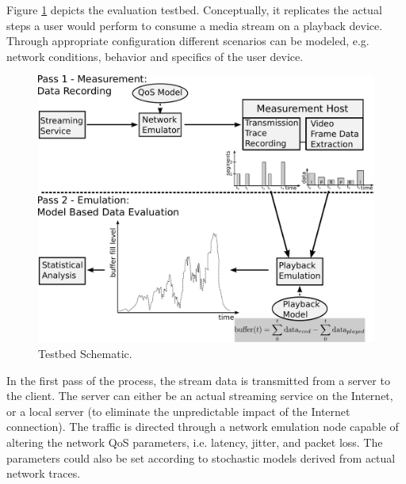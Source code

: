 

Figure \ref{c3:fig:testbed} depicts the evaluation testbed. %
Conceptually, it replicates the actual steps a user would perform to consume a media stream on a playback device. Through appropriate configuration different scenarios can be modeled, e.g. network conditions, behavior and specifics of the user device.
 
 
\begin{figure}[htbp]
	\includegraphics[width=\textwidth]{images/measurement-model.pdf}
	\caption{Testbed Schematic.}
	\label{c3:fig:testbed}
\end{figure}

In the first pass of the process, the stream data is transmitted from a server to the client. The server can either be an actual streaming service on the Internet, or a local server (to eliminate the unpredictable impact of the Internet connection). The traffic is directed through a network emulation node capable of altering the network QoS parameters, i.e. latency, jitter, and packet loss. The parameters could also be set according to stochastic models derived from actual network traces. 

